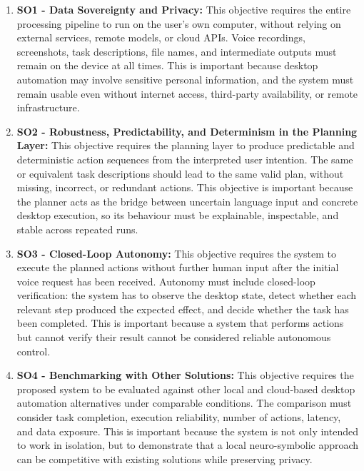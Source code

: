 \begin{enumerate}

    \item \label{so:1} \textbf{SO1 - Data Sovereignty and Privacy:} This objective requires the entire processing pipeline to run on the user's own computer, without relying on external services, remote models, or cloud APIs. Voice recordings, screenshots, task descriptions, file names, and intermediate outputs must remain on the device at all times. This is important because desktop automation may involve sensitive personal information, and the system must remain usable even without internet access, third-party availability, or remote infrastructure.

    \item \label{so:2} \textbf{SO2 - Robustness, Predictability, and Determinism in the Planning Layer:} This objective requires the planning layer to produce predictable and deterministic action sequences from the interpreted user intention. The same or equivalent task descriptions should lead to the same valid plan, without missing, incorrect, or redundant actions. This objective is important because the planner acts as the bridge between uncertain language input and concrete desktop execution, so its behaviour must be explainable, inspectable, and stable across repeated runs.

    \item \label{so:3} \textbf{SO3 - Closed-Loop Autonomy:} This objective requires the system to execute the planned actions without further human input after the initial voice request has been received. Autonomy must include closed-loop verification: the system has to observe the desktop state, detect whether each relevant step produced the expected effect, and decide whether the task has been completed. This is important because a system that performs actions but cannot verify their result cannot be considered reliable autonomous control.

    \item \label{so:4} \textbf{SO4 - Benchmarking with Other Solutions:} This objective requires the proposed system to be evaluated against other local and cloud-based desktop automation alternatives under comparable conditions. The comparison must consider task completion, execution reliability, number of actions, latency, and data exposure. This is important because the system is not only intended to work in isolation, but to demonstrate that a local neuro-symbolic approach can be competitive with existing solutions while preserving privacy.


\end{enumerate}
